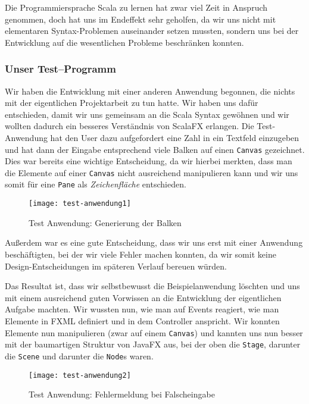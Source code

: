 Die Programmiersprache Scala zu lernen hat zwar viel Zeit in Anspruch genommen, doch hat uns im Endeffekt sehr geholfen, da wir uns nicht mit elementaren Syntax-Problemen auseinander setzen mussten, sondern uns bei der Entwicklung auf die wesentlichen Probleme beschränken konnten.

\subsubsection{Unser Test--Programm}
Wir haben die Entwicklung mit einer anderen Anwendung begonnen, die nichts mit der eigentlichen Projektarbeit zu tun hatte. Wir haben uns dafür entschieden, damit wir uns gemeinsam an die Scala Syntax gewöhnen und wir wollten dadurch ein besseres Verständnis von ScalaFX erlangen. Die Test-Anwendung hat den User dazu aufgefordert eine Zahl in ein Textfeld einzugeben und hat dann der Eingabe entsprechend viele Balken auf einen \texttt{Canvas} gezeichnet. Dies war bereits eine wichtige Entscheidung, da wir hierbei merkten, dass man die Elemente auf einer \texttt{Canvas} nicht ausreichend manipulieren kann und wir uns somit für eine \texttt{Pane} als \textit{Zeichenfläche} entschieden.

\begin{figure}[!htb]
    \centering
      \texttt{[image: test-anwendung1]}
    \caption{Test Anwendung: Generierung der Balken}
\end{figure}

Außerdem war es eine gute Entscheidung, dass wir uns erst mit einer Anwendung beschäftigten, bei der wir viele Fehler machen konnten, da wir somit keine Design-Entscheidungen im späteren Verlauf bereuen würden.


Das Resultat ist, dass wir selbstbewusst die Beispielanwendung löschten und uns mit einem ausreichend guten Vorwissen an die Entwicklung der eigentlichen Aufgabe machten. Wir wussten nun, wie man auf Events reagiert, wie man Elemente in FXML definiert und in dem Controller anspricht. Wir konnten Elemente nun manipulieren (zwar auf einem \texttt{Canvas}) und kannten uns nun besser mit der baumartigen Struktur von JavaFX aus, bei der oben die \texttt{Stage}, darunter die \texttt{Scene} und darunter die \texttt{Node}s waren.


\begin{figure}[!htb]
    \centering
      \texttt{[image: test-anwendung2]}
    \caption{Test Anwendung: Fehlermeldung bei Falscheingabe}
\end{figure}

